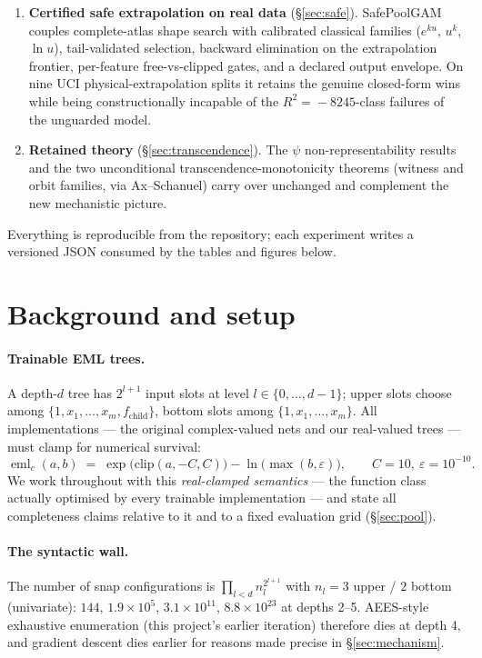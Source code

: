 \documentclass[11pt]{article}
\newcommand{\eml}{\operatorname{eml}}
\begin{document}
\begin{enumerate}
  exactly in seconds.
\item \textbf{Certified safe extrapolation on real data}
  (\S\ref{sec:safe}). SafePoolGAM couples complete-atlas shape search
  with calibrated classical families ($e^{ku}$, $u^k$, $\ln u$),
  tail-validated selection, backward elimination on the extrapolation
  frontier, per-feature free-vs-clipped gates, and a declared output
  envelope. On nine UCI physical-extrapolation splits it retains the
  genuine closed-form wins while being constructionally incapable of
  the $R^2\!=\!-8245$-class failures of the unguarded model.
\item \textbf{Retained theory} (\S\ref{sec:transcendence}). The
  $\psi$ non-representability results and the two unconditional
  transcendence-monotonicity theorems (witness and orbit families,
  via Ax--Schanuel) carry over unchanged and complement the new
  mechanistic picture.
\end{enumerate}

Everything is reproducible from the repository; each experiment
writes a versioned JSON consumed by the tables and figures below.

\section{Background and setup}\label{sec:setup}

\paragraph{Trainable EML trees.} A depth-$d$ tree has $2^{l+1}$ input
slots at level $l\in\{0,\dots,d-1\}$; upper slots choose among
$\{1, x_1,\dots,x_m, f_{\text{child}}\}$, bottom slots among
$\{1, x_1,\dots,x_m\}$. All implementations — the original
complex-valued nets and our real-valued trees — must clamp for
numerical survival:
\[
\eml_c(a,b) \;=\; \exp\bigl(\mathrm{clip}(a,-C,C)\bigr) -
\ln\bigl(\max(b,\varepsilon)\bigr),
\qquad C=10,\ \varepsilon=10^{-10} .
\]
We work throughout with this \emph{real-clamped semantics} — the
function class actually optimised by every trainable implementation —
and state all completeness claims relative to it and to a fixed
evaluation grid (\S\ref{sec:pool}).

\paragraph{The syntactic wall.} The number of snap configurations is
$\prod_{l<d} n_l^{2^{l+1}}$ with $n_l=3$ upper / $2$ bottom
(univariate): $144$, $1.9\times10^{5}$, $3.1\times10^{11}$,
$8.8\times10^{23}$ at depths 2--5. AEES-style exhaustive enumeration (this project's earlier iteration) therefore dies at depth 4, and gradient descent dies
earlier for reasons made precise in \S\ref{sec:mechanism}.
\end{document}
